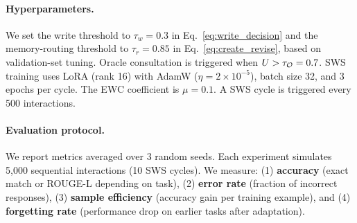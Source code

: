\paragraph{Hyperparameters.}
We set the write threshold to $\tau_w = 0.3$ in Eq.~\eqref{eq:write_decision} and the memory-routing threshold to $\tau_r = 0.85$ in Eq.~\eqref{eq:create_revise}, based on validation-set tuning.  Oracle consultation is triggered when $U > \tau_{\mathcal{O}} = 0.7$.  SWS training uses LoRA (rank 16) with AdamW ($\eta = 2 \times 10^{-5}$), batch size 32, and 3 epochs per cycle.  The EWC coefficient is $\mu = 0.1$.  A SWS cycle is triggered every 500 interactions.

\paragraph{Evaluation protocol.}
We report metrics averaged over 3 random seeds.  Each experiment simulates 5{,}000 sequential interactions (10 SWS cycles).  We measure: (1) \textbf{accuracy} (exact match or ROUGE-L depending on task), (2) \textbf{error rate} (fraction of incorrect responses), (3) \textbf{sample efficiency} (accuracy gain per training example), and (4) \textbf{forgetting rate} (performance drop on earlier tasks after adaptation).
